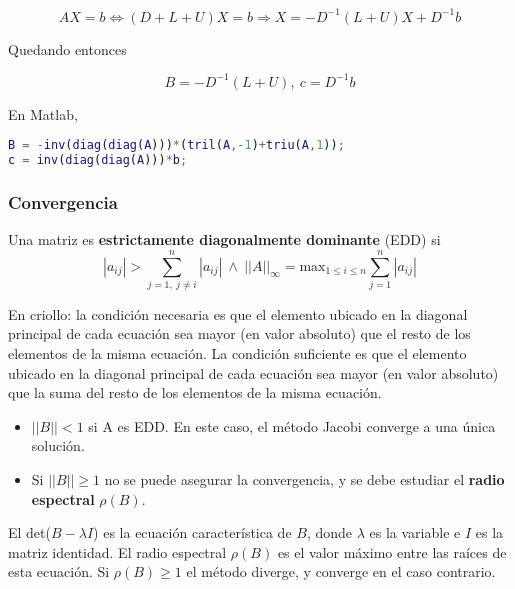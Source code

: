 \documentclass{article}
\begin{document}
\begin{equation}\label{eq:jacobi_vec}
    AX = b \Longleftrightarrow (D+L+U)X = b \Longrightarrow X = -D^{-1}(L+U)X + D^{-1}b
\end{equation}

Quedando entonces

\begin{equation*}
    B = -D^{-1}(L+U),\ c = D^{-1}b
\end{equation*}

En Matlab,

\begin{lstlisting}[language=Matlab]
B = -inv(diag(diag(A)))*(tril(A,-1)+triu(A,1));
c = inv(diag(diag(A)))*b;
\end{lstlisting}

\subsubsection{Convergencia}

Una matriz es \textbf{estrictamente diagonalmente dominante} (EDD) si
\begin{equation*}
    \left|a_{ij}\right| > \sum_{j=1,\ j\neq i}^{n}\left|a_{ij}\right|\ \land\ \left|\left|A\right|\right|_\infty = \text{max}_{1\leq i\leq n} \sum_{j=1}^{n}\left|a_{ij}\right|
\end{equation*}

En criollo: la condición necesaria es que el elemento ubicado en la diagonal principal de cada ecuación sea mayor (en valor absoluto) que el resto de los elementos de la misma ecuación. La condición suficiente es que el elemento ubicado en la diagonal principal de cada ecuación sea mayor (en valor absoluto) que la suma del resto de los elementos de la misma ecuación.

\begin{itemize}
    \item $||B||<1$ si A es EDD. En este caso, el método Jacobi converge a una única solución.
    \item Si $||B||\geq1$ no se puede asegurar la convergencia, y se debe estudiar el \textbf{radio espectral} $\rho(B)$.
\end{itemize}

El det($B-\lambda I$) es la ecuación característica de $B$, donde $\lambda$ es la variable e $I$ es la matriz identidad. El radio espectral $\rho(B)$ es el valor máximo entre las raíces de esta ecuación. Si $\rho(B)\geq1$ el método diverge, y converge en el caso contrario.
\end{document}
